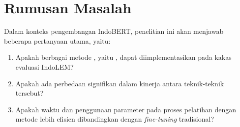 \section{Rumusan Masalah}

Dalam konteks pengembangan IndoBERT, penelitian ini akan menjawab beberapa pertanyaan utama, yaitu:

\begin{enumerate}
    \item Apakah berbagai metode \PEFT, yaitu \methodPEFT, dapat diimplementasikan pada kakas evaluasi IndoLEM?
    \item Apakah ada perbedaan signifikan dalam kinerja antara teknik-teknik \PEFT tersebut?
    \item Apakah waktu dan penggunaan parameter pada proses pelatihan dengan metode \PEFT lebih efisien dibandingkan dengan \textit{fine-tuning} tradisional?
\end{enumerate}

